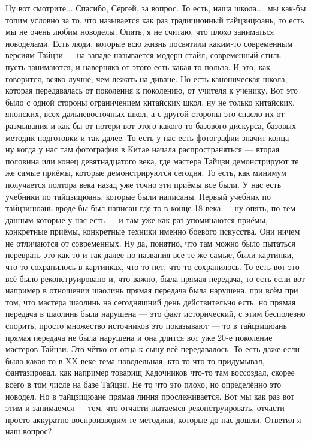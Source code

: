 Ну вот смотрите... Спасибо, Сергей, за вопрос. То есть, наша школа...\ мы как-бы топим условно за
то, что называется как раз традиционный тайцзицюань, то есть мы не очень любим новоделы. Опять, я
не считаю, что плохо заниматься новоделами. Есть люди, которые всю жизнь посвятили каким-то 
современным версиям Тайцзи --- на западе называется модерн стайл, современный стиль ---
пусть занимаются, и наверняка от этого есть какая-то польза. И это, как говорится, всяко лучше, 
чем лежать на диване. Но есть каноническая школа, которая передавалась от поколения к 
поколению, от учителя к ученику. Вот это было с одной стороны ограничением китайских школ, ну 
не только китайских, японских, всех дальневосточных школ, а с другой стороны это спасло их от 
размывания и как бы от потери вот этого какого-то базового дискурса, базовых методик 
подготовки и так далее. То есть у нас есть фотографии значит конца --- ну когда у нас там 
фотография в Китае начала распространяться --- вторая половина или конец девятнадцатого века,
где мастера Тайцзи демонстрируют те же самые приёмы, которые демонстрируются сегодня. То 
есть, как минимум получается полтора века назад уже точно эти приёмы все были. У нас есть 
учебники по тайцзицюань, которые были написаны. Первый учебник по тайцзицюань 
вроде-бы был написан где-то в конце 18 века --- ну опять, по тем данным которые у нас есть --- и
там уже 
как раз упоминаются приёмы, конкретные приёмы, конкретные техники именно боевого искусства. 
Они ничем не отличаются от современных. Ну да, понятно, что там можно было пытаться переврать 
это как-то и так далее но названия все те же самые, были картинки, что-то сохранилось в 
картинках, что-то нет, что-то сохранилось. То есть вот это всё было реконструировано и, что 
важно, была прямая передача, то есть если вот например в отношении шаолинь прямая передача 
была нарушена, при всём при том, что мастера шаолинь на сегодняшний день действительно есть,
но прямая передача в шаолинь была нарушена --- это факт исторический, с этим 
бесполезно спорить, просто множество источников это показывают --- то в тайцзицюань прямая 
передача не была нарушена и она длится вот уже 20-е поколение мастеров Тайцзи. Это чётко от отца к 
сыну всё передавалось. То есть даже если была какая-то в XX веке тема новодельная, кто-то что-то 
придумывал, фантазировал, как например товарищ Кадочников что-то там воссоздал, скорее всего 
в том числе на базе Тайцзи. Не то что это плохо, но определённо это новодел. Но в тайцзицюане 
прямая линия прослеживается. Вот мы как раз вот этим и занимаемся --- тем, что отчасти пытаемся 
реконструировать, отчасти просто аккуратно воспроизводим те методики, которые до нас дошли. 
Ответил я наш вопрос?

